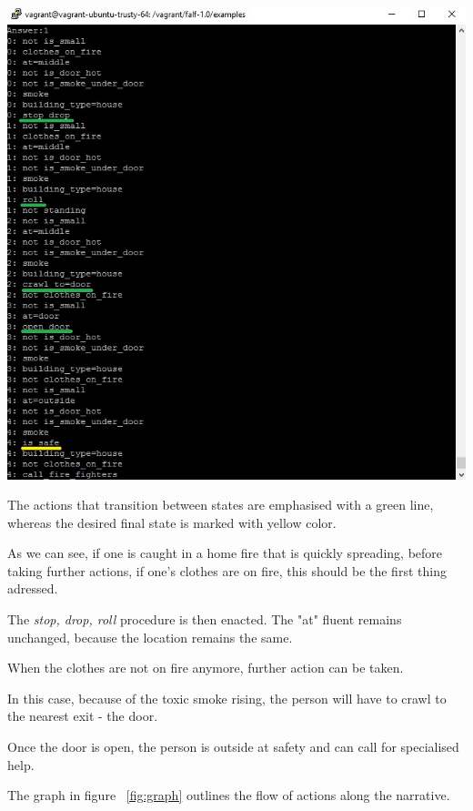 \documentclass[a4paper,12pt]{report}
\begin{document}
\includegraphics[scale=0.8]{Screenshot_home_fire.jpg}

The actions that transition between states are emphasised with a green line, whereas the desired final state is marked with yellow color.

As we can see, if one is caught in a home fire that is quickly spreading, before taking further actions, if one's clothes are on fire, this should be the first thing adressed.

The {\it stop, drop, roll} procedure is then enacted. The "at" fluent remains unchanged, because the location remains the same.

When the clothes are not on fire anymore, further action can be taken. 

In this case, because of the toxic smoke rising, the person will have to crawl to the nearest exit - the door. 

Once the door is open, the person is outside at safety and can call for specialised help.

The graph in figure ~\ref{fig:graph} outlines the flow of actions along the narrative.
\end{document}
